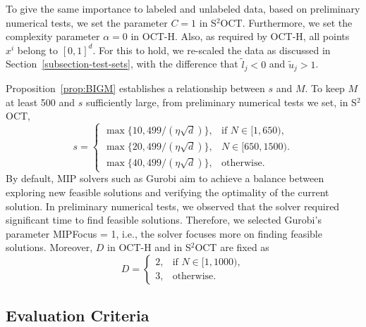 \documentclass[a4paper,american,reqno]{amsart}
\newcommand{\codename}[1]{\textsf{#1}}
\newcommand{\rev}[1]{#1}
\begin{document}
To give the same importance to labeled and unlabeled data, \rev{based
  on preliminary numerical tests,} we set the
parameter $C=1$ in S$^2$OCT. Furthermore, we set the complexity
parameter $\alpha = 0$ in OCT-H. Also, as required by OCT-H, all
points $x^i$ belong to $[0,1]^d$.  For this to hold, we re-scaled the
data as discussed in Section~\ref{subsection-test-sets}, with the
difference that $\tilde{l}_j < 0$ and $\tilde{u}_j > 1$.

Proposition~\ref{prop:BIGM} establishes a relationship between $s$ and
$M$. To keep $M$ at least 500 and $s$ sufficiently large, from
preliminary numerical tests we set, in S$^2$OCT,
\begin{equation*}
  s =
  \begin{cases}
    \max\{10,499/(\eta\sqrt{d})\},  & \text{if } N \in  [1,650),\\
    \max\{20,499/(\eta\sqrt{d})\},  &  N \in  [650,1500).\\
    \max\{40,499/(\eta\sqrt{d})\},  & \text{otherwise}.
  \end{cases}
\end{equation*}
By default, MIP solvers such as \codename{Gurobi} aim to achieve a balance between
exploring new feasible solutions and verifying the optimality of the
current solution. In preliminary numerical tests, we observed that the
solver required significant time to find feasible solutions. Therefore,
we selected \codename{Gurobi}'s parameter \textsf{MIPFocus} = 1, i.e., the solver
focuses more on finding feasible solutions.
Moreover, $D$ in OCT-H and in S$^2$OCT are fixed as
\begin{equation*}
  D=
  \begin{cases}
    2,  & \text{if } N \in  [1,1000),\\
    3,  & \text{otherwise}.
  \end{cases}
\end{equation*}


\subsection{Evaluation Criteria}
\label{comparsions-OCT}
\end{document}
